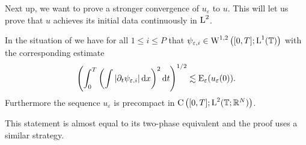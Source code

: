 Next up, we want to prove a stronger convergence of $ u_{ \varepsilon } $ to $ 
u 
$. This will let us prove that $ u $ achieves its initial data continuously in 
$ \operatorname{L}^{ 2 } $.

\begin{lemma}
	\label{continuity_in_l2_and_initial_data_multiphase}
	In the situation of  we have 
	for all $ 1 \leq i \leq P $ that
	$ \psi_{ \varepsilon , i } \in \operatorname{W}^{ 1 , 2 } \left(
		[ 0 , T ] ; \operatorname{L}^{ 1 } ( \operatorname{\mathbb{T}} )
	\right)
	$
	with the corresponding estimate
	\begin{equation}
		\label{l2_estimate_on_partial_t_psi_i}
		\left(
			\int_{ 0 }^{ T }
				\left(
					\int
						\abs{ \partial_{ t } \psi_{ \varepsilon , i } }
					\dd{ x }
				\right)^{ 2 }
			\dd{ t }
		\right)^{ 1/2 }
		\lesssim
		\operatorname{E}_{ \varepsilon } ( u_{ \varepsilon }( 0 ) ).
	\end{equation}
	Furthermore the sequence $ u_{ \varepsilon } $ is precompact in 
	$ \operatorname{C} \left(
		[ 0 , T ] ; \operatorname{L}^{ 2 } ( \operatorname{\mathbb{T}} ; \mathbb{ R }^{ N } )
	\right) $.
\end{lemma}

\begin{remark}
	This statement is almost equal to its two-phase equivalent 
	 and the proof uses a similar strategy.
\end{remark}

